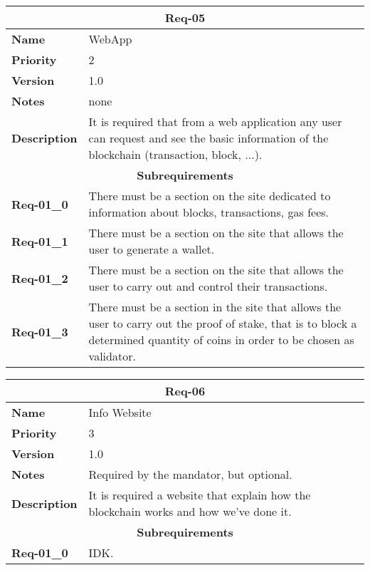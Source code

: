 \documentclass{article}
\begin{document}
\bgroup{}
\def\arraystretch{1.25}
\begin{center}
    \begin{tabular}{ |l|p{9cm}| }
        \hline
        \multicolumn{2}{|c|}{\textbf{Req-05}} \\
        \hline
        \textbf{Name} & WebApp \\
        \hline
        \textbf{Priority} & 2 \\
        \hline
        \textbf{Version} & 1.0 \\
        \hline
        \textbf{Notes} & none \\
        \hline
        \textbf{Description} & It is required that from a web application any user can request and see the basic information of the blockchain (transaction, block, ...). \\
        \hline
        \multicolumn{2}{|c|}{\textbf{Subrequirements}} \\
        \hline
        \textbf{Req-01\_0} & There must be a section on the site dedicated to information about blocks, transactions, gas fees. \\
        \hline
        \textbf{Req-01\_1} & There must be a section on the site that allows the user to generate a wallet. \\
        \hline
        \textbf{Req-01\_2} & There must be a section on the site that allows the user to carry out and control their transactions. \\
        \hline
        \textbf{Req-01\_3} & There must be a section in the site that allows the user to carry out the proof of stake, that is to block a determined quantity of coins in order to be chosen as validator. \\
        \hline
    \end{tabular}
\end{center}
\egroup{}

\bgroup{}
\def\arraystretch{1.25}
\begin{center}
    \begin{tabular}{ |l|p{9cm}| }
        \hline
        \multicolumn{2}{|c|}{\textbf{Req-06}} \\
        \hline
        \textbf{Name} & Info Website \\
        \hline
        \textbf{Priority} & 3 \\
        \hline
        \textbf{Version} & 1.0 \\
        \hline
        \textbf{Notes} & Required by the mandator, but optional. \\
        \hline
        \textbf{Description} & It is required a website that explain how the blockchain works and how we've done it. \\
        \hline
        \multicolumn{2}{|c|}{\textbf{Subrequirements}} \\
        \hline
        \textbf{Req-01\_0} & IDK. \\
        \hline
    \end{tabular}
\end{center}
\egroup{}
\end{document}
